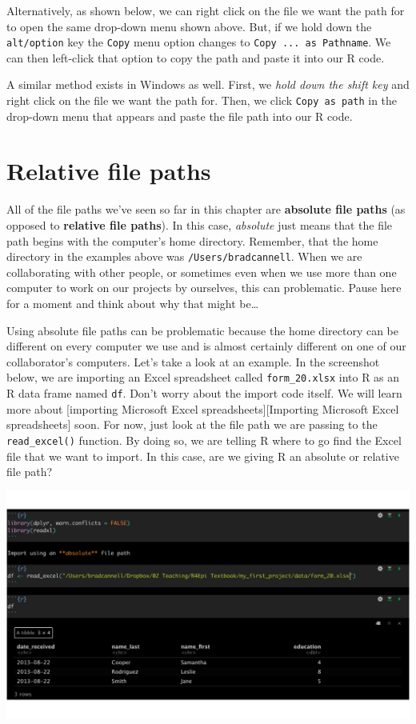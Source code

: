 \documentclass[
  letterpaper,
  DIV=11,
  numbers=noendperiod]{scrreprt}
\begin{document}
Alternatively, as shown below, we can right click on the file we want
the path for to open the same drop-down menu shown above. But, if we
hold down the \texttt{alt/option} key the \texttt{Copy} menu option
changes to \texttt{Copy\ ...\ as\ Pathname}. We can then left-click that
option to copy the path and paste it into our R code.

A similar method exists in Windows as well. First, we \emph{hold down
the shift key} and right click on the file we want the path for. Then,
we click \texttt{Copy\ as\ path} in the drop-down menu that appears and
paste the file path into our R code.

\section{Relative file paths}\label{relative-file-paths}

All of the file paths we've seen so far in this chapter are
\textbf{absolute file paths} (as opposed to \textbf{relative file
paths}). In this case, \emph{absolute} just means that the file path
begins with the computer's home directory. Remember, that the home
directory in the examples above was \texttt{/Users/bradcannell}. When we
are collaborating with other people, or sometimes even when we use more
than one computer to work on our projects by ourselves, this can
problematic. Pause here for a moment and think about why that might
be\ldots{}

Using absolute file paths can be problematic because the home directory
can be different on every computer we use and is almost certainly
different on one of our collaborator's computers. Let's take a look at
an example. In the screenshot below, we are importing an Excel
spreadsheet called \texttt{form\_20.xlsx} into R as an R data frame
named \texttt{df}. Don't worry about the import code itself. We will
learn more about {[}importing Microsoft Excel
spreadsheets{]}{[}Importing Microsoft Excel spreadsheets{]} soon. For
now, just look at the file path we are passing to the
\texttt{read\_excel()} function. By doing so, we are telling R where to
go find the Excel file that we want to import. In this case, are we
giving R an absolute or relative file path?

\includegraphics{chapters/file_paths/relative_file_paths_01_absolute_brad.png}
\end{document}
